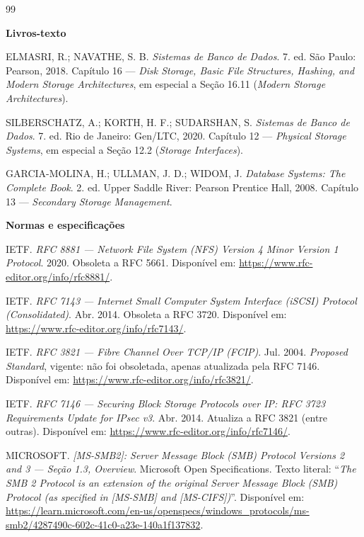 \documentclass[11pt,a4paper]{article}
\begin{document}
\begin{thebibliography}{99}

\small

\bibitem[Livros]{}\textbf{\large Livros-texto}

 ELMASRI, R.; NAVATHE, S. B. \textit{Sistemas de Banco de Dados}. 7. ed.
São Paulo: Pearson, 2018. Capítulo 16 --- \textit{Disk Storage, Basic File Structures, Hashing, and
Modern Storage Architectures}, em especial a Seção 16.11 (\textit{Modern Storage Architectures}).

 SILBERSCHATZ, A.; KORTH, H. F.; SUDARSHAN, S. \textit{Sistemas de Banco
de Dados}. 7. ed. Rio de Janeiro: Gen/LTC, 2020. Capítulo 12 --- \textit{Physical Storage Systems},
em especial a Seção 12.2 (\textit{Storage Interfaces}).

 GARCIA-MOLINA, H.; ULLMAN, J. D.; WIDOM, J. \textit{Database Systems:
The Complete Book}. 2. ed. Upper Saddle River: Pearson Prentice Hall, 2008. Capítulo 13 ---
\textit{Secondary Storage Management}.

\bigskip
\bibitem[Normas]{}\textbf{\large Normas e especificações}

 IETF. \textit{RFC 8881 --- Network File System (NFS) Version 4 Minor Version 1
Protocol}. 2020. Obsoleta a RFC 5661. Disponível em: \url{https://www.rfc-editor.org/info/rfc8881/}.

 IETF. \textit{RFC 7143 --- Internet Small Computer System Interface (iSCSI)
Protocol (Consolidated)}. Abr. 2014. Obsoleta a RFC 3720. Disponível em:
\url{https://www.rfc-editor.org/info/rfc7143/}.

 IETF. \textit{RFC 3821 --- Fibre Channel Over TCP/IP (FCIP)}. Jul. 2004.
\emph{Proposed Standard}, vigente: não foi obsoletada, apenas atualizada pela RFC 7146. Disponível
em: \url{https://www.rfc-editor.org/info/rfc3821/}.

 IETF. \textit{RFC 7146 --- Securing Block Storage Protocols over IP: RFC 3723
Requirements Update for IPsec v3}. Abr. 2014. Atualiza a RFC 3821 (entre outras). Disponível em:
\url{https://www.rfc-editor.org/info/rfc7146/}.

 MICROSOFT. \textit{[MS-SMB2]: Server Message Block (SMB) Protocol Versions 2 and
3 --- Seção 1.3, Overview}. Microsoft Open Specifications. Texto literal: ``\textit{The SMB 2
Protocol is an extension of the original Server Message Block (SMB) Protocol (as specified in
[MS-SMB] and [MS-CIFS])}''. Disponível em:
\url{https://learn.microsoft.com/en-us/openspecs/windows_protocols/ms-smb2/4287490c-602c-41c0-a23e-140a1f137832}.


\end{thebibliography}
\end{document}
